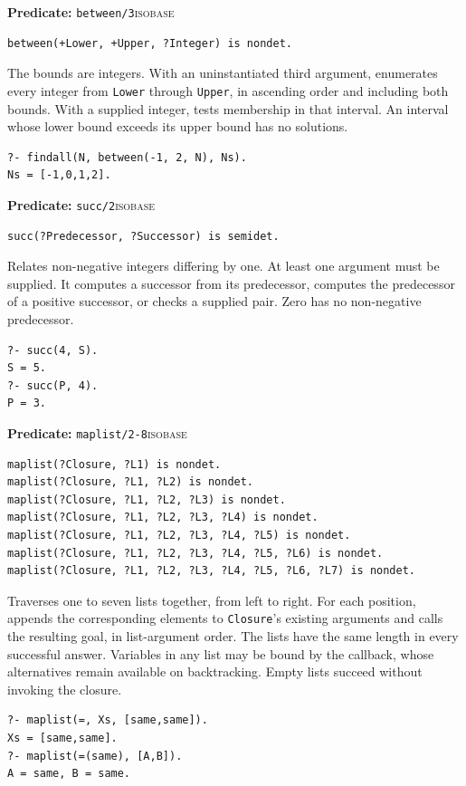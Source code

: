 \par{}
\noindent \textbf{Predicate:} \texttt{between/3}\hfill\textsc{isobase}
\begin{verbatim}
between(+Lower, +Upper, ?Integer) is nondet.
\end{verbatim}
\noindent The bounds are integers. With an uninstantiated third argument,
enumerates every integer from \texttt{Lower} through \texttt{Upper}, in
ascending order and including both bounds. With a supplied integer, tests
membership in that interval. An interval whose lower bound exceeds its upper
bound has no solutions.
\begin{verbatim}
?- findall(N, between(-1, 2, N), Ns).
Ns = [-1,0,1,2].
\end{verbatim}

\par{}
\noindent \textbf{Predicate:} \texttt{succ/2}\hfill\textsc{isobase}
\begin{verbatim}
succ(?Predecessor, ?Successor) is semidet.
\end{verbatim}
\noindent Relates non-negative integers differing by one. At least one argument
must be supplied. It computes a successor from its predecessor, computes the
predecessor of a positive successor, or checks a supplied pair. Zero has no
non-negative predecessor.
\begin{verbatim}
?- succ(4, S).
S = 5.
?- succ(P, 4).
P = 3.
\end{verbatim}

\par{}
\noindent \textbf{Predicate:} \texttt{maplist/2-8}\hfill\textsc{isobase}
\begin{verbatim}
maplist(?Closure, ?L1) is nondet.
maplist(?Closure, ?L1, ?L2) is nondet.
maplist(?Closure, ?L1, ?L2, ?L3) is nondet.
maplist(?Closure, ?L1, ?L2, ?L3, ?L4) is nondet.
maplist(?Closure, ?L1, ?L2, ?L3, ?L4, ?L5) is nondet.
maplist(?Closure, ?L1, ?L2, ?L3, ?L4, ?L5, ?L6) is nondet.
maplist(?Closure, ?L1, ?L2, ?L3, ?L4, ?L5, ?L6, ?L7) is nondet.
\end{verbatim}
\noindent Traverses one to seven lists together, from left to right. For each
position, appends the corresponding elements to \texttt{Closure}'s existing
arguments and calls the resulting goal, in list-argument order. The lists have
the same length in every successful answer. Variables in any list may be bound
by the callback, whose alternatives remain available on backtracking. Empty
lists succeed without invoking the closure.
\begin{verbatim}
?- maplist(=, Xs, [same,same]).
Xs = [same,same].
?- maplist(=(same), [A,B]).
A = same, B = same.
\end{verbatim}

